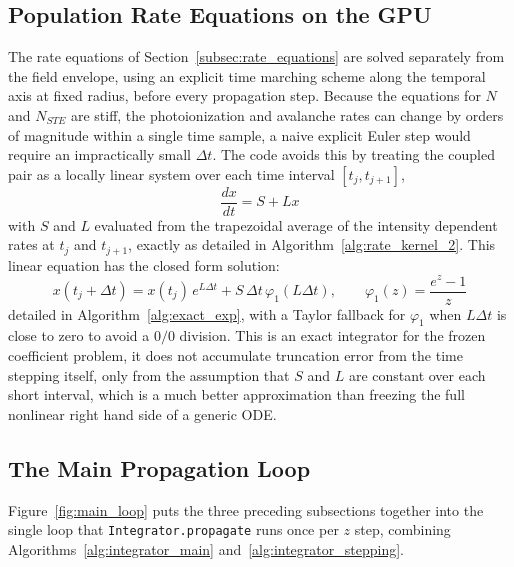 \subsection{Population Rate Equations on the GPU}

The rate equations of Section~\ref{subsec:rate_equations} are solved separately from the field envelope, using an explicit time marching scheme along the temporal axis at fixed radius, before every propagation step. Because the equations for $N$ and $N_{STE}$ are stiff, the photoionization and avalanche rates can change by orders of magnitude within a single time sample, a naive explicit Euler step would require an impractically small $\Delta t$. The code avoids this by treating the coupled pair as a locally linear system over each time interval $[t_j,t_{j+1}]$,
\begin{equation}
\frac{dx}{dt} = S + Lx
\end{equation}
with $S$ and $L$ evaluated from the trapezoidal average of the intensity dependent rates at $t_j$ and $t_{j+1}$, exactly as detailed in Algorithm~\ref{alg:rate_kernel_2}. This linear equation has the closed form solution:
\begin{equation}
x(t_j+\Delta t) = x(t_j)\,e^{L\Delta t} + S\,\Delta t\,\varphi_1(L\Delta t), \qquad \varphi_1(z) = \frac{e^z-1}{z}
\end{equation}
detailed in Algorithm~\ref{alg:exact_exp}, with a Taylor fallback for $\varphi_1$ when $L\Delta t$ is close to zero to avoid a $0/0$ division. This is an exact integrator for the frozen coefficient problem, it does not accumulate truncation error from the time stepping itself, only from the assumption that $S$ and $L$ are constant over each short interval, which is a much better approximation than freezing the full nonlinear right hand side of a generic ODE.

\subsection{The Main Propagation Loop}

Figure~\ref{fig:main_loop} puts the three preceding subsections together into the single loop that \texttt{Integrator.propagate} runs once per $z$ step, combining Algorithms~\ref{alg:integrator_main} and~\ref{alg:integrator_stepping}.


